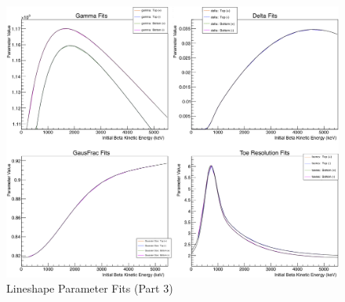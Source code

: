 \begin{figure}[h!!tb]
	\centering
	\includegraphics[width=.999\linewidth]
	{Figures/LineshapeParams_part3.png}
	\caption[Lineshape Parameter Fits (Part 3)]{Lineshape Parameter Fits (Part 3)}	
	\label{fig:lineshapeparams_part3}
\end{figure}

